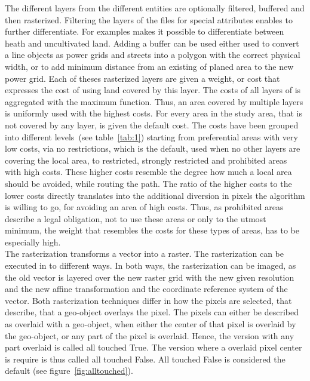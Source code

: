 The different layers from the different entities are optionally filtered, buffered and then rasterized.
Filtering the layers of the files for special attributes enables to further differentiate.
For examples makes it possible to differentiate between heath and uncultivated land.
Adding a buffer can be used either used to convert a line objects as power grids and streets into a polygon with the
correct physical width, or to add minimum distance from an existing of planed area to the new power grid.
Each of theses rasterized layers are given a weight, or cost that expresses the cost of using land covered by this layer.
The costs of all layers of is aggregated with the maximum function.
Thus, an area covered by multiple layers is uniformly used with the highest costs.
For every area in the study area, that is not covered by any layer, is given the default cost.
The costs have been grouped into different levels~(see table~\ref{tab:1}) starting from preferential areas with
very low costs, via no restrictions, which is the default, used when no other layers are covering the local area,
to restricted, strongly restricted and prohibited areas with high costs.
These higher costs resemble the degree how much a local area should be avoided, while routing the path.
The ratio of the higher costs to the lower costs directly translates into the additional diversion in pixels
the algorithm is willing to go, for avoiding an area of high costs.
Thus, as prohibited areas describe a legal obligation, not to use these areas or only to the utmost minimum,
the weight that resembles the costs for these types of areas, has to be especially high. \\
The rasterization transforms a vector into a raster.
The rasterization can be executed in to different ways.
In both ways, the rasterization can be imaged, as the old vector is layered over the new raster grid with the new
given resolution and the new affine transformation and the coordinate reference system of the vector.
Both rasterization techniques differ in how the pixels are selected, that describe, that a geo-object overlays the pixel.
The pixels can either be described as overlaid with a geo-object, when either the center of that pixel is overlaid
by the geo-object, or any part of the pixel is overlaid.
Hence, the version with any part overlaid is called all touched True.
The version where a overlaid pixel center is require is thus called all touched False.
All touched False is considered the default (see figure~\ref{fig:alltouched}).
